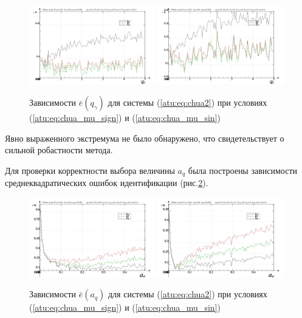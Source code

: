 \begin{figure}[htb!]
\centerline{
  \includegraphics[width=0.49\textwidth]{p/cha/chua/chua_m5p-p_qg_e_sign.png}
  \includegraphics[width=0.49\textwidth]{p/cha/chua/chua_m5p-p_qg_e_sin.png}
}
  \caption{Зависимости  $\bar{e}(q_\gamma)$ для системы (\ref{atu:eq:chua2})
  при условиях (\ref{atu:eq:chua_mu_sign}) и (\ref{atu:eq:chua_mu_sin})
}
\label{atu:f:chua_e_qgamma}
\end{figure}

Явно выраженного экстремума не было обнаружено, что свидетельствует
о сильной робастности метода.

Для проверки корректности выбора величины $a_q$ была построены зависимости
среднеквадратических ошибок идентификации (рис.\ref{atu:f:chua_e_a_q}).


\begin{figure}[htb!]
\centerline{
  \includegraphics[width=0.49\textwidth]{p/cha/chua/chua_m5p-p_a_q_e_sign.png}
  \includegraphics[width=0.49\textwidth]{p/cha/chua/chua_m5p-p_a_q_e_sin.png}
}
  \caption{Зависимости  $\bar{e}(a_q)$ для системы (\ref{atu:eq:chua2})
  при условиях (\ref{atu:eq:chua_mu_sign}) и (\ref{atu:eq:chua_mu_sin})
}
\label{atu:f:chua_e_a_q}
\end{figure}


